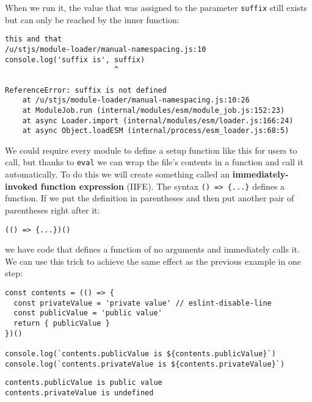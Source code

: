 \documentclass[krantzl]{krantz}
\newcommand{\glossref}[1]{\textbf{#1}}
\begin{document}
\noindent When we run it,
the value that was assigned to the parameter \texttt{suffix} still exists
but can only be reached by the inner function:


\begin{lstlisting}[frame=single,frameround=tttt]
this and that
/u/stjs/module-loader/manual-namespacing.js:10
console.log('suffix is', suffix)
                         ^

ReferenceError: suffix is not defined
    at /u/stjs/module-loader/manual-namespacing.js:10:26
    at ModuleJob.run (internal/modules/esm/module_job.js:152:23)
    at async Loader.import (internal/modules/esm/loader.js:166:24)
    at async Object.loadESM (internal/process/esm_loader.js:68:5)
\end{lstlisting}



We could require every module to define a setup function like this for users to call,
but thanks to \texttt{eval} we can wrap the file's contents in a function and call it automatically.
To do this we will create something called
an \glossref{immediately-invoked function expression} (IIFE).
The syntax \texttt{() => \{...\}} defines a function.
If we put the definition in parentheses and then put another pair of parentheses right after it:

\begin{lstlisting}[frame=single,frameround=tttt]
(() => {...})()
\end{lstlisting}


\noindent we have code that defines a function of no arguments and immediately calls it.
We can use this trick to achieve the same effect as the previous example in one step:


\begin{lstlisting}[frame=single,frameround=tttt]
const contents = (() => {
  const privateValue = 'private value' // eslint-disable-line
  const publicValue = 'public value'
  return { publicValue }
})()

console.log(`contents.publicValue is ${contents.publicValue}`)
console.log(`contents.privateValue is ${contents.privateValue}`)
\end{lstlisting}



\begin{lstlisting}[frame=single,frameround=tttt]
contents.publicValue is public value
contents.privateValue is undefined
\end{lstlisting}
\end{document}
